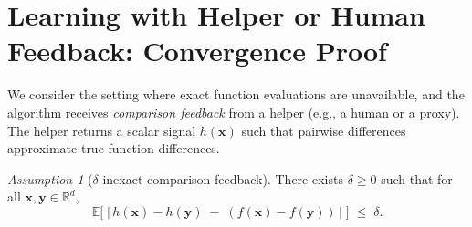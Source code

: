 \documentclass[twoside]{article}
\theoremstyle{plain}
\theoremstyle{definition}
\theoremstyle{remark}
\newtheorem{assumption}{Assumption}
\def\vx{{\bm{x}}}
\def\vy{{\bm{y}}}
\newcommand{\E}{\mathbb{E}}
\newcommand{\R}{\mathbb{R}}
\begin{document}
\section{Learning with Helper or Human Feedback: Convergence Proof}

We consider the setting where exact function evaluations are unavailable, and the
algorithm receives \emph{comparison feedback} from a helper (e.g., a human or a
proxy). The helper returns a scalar signal $h(\vx)$ such that pairwise
differences approximate true function differences.

\begin{assumption}[$\delta$-inexact comparison feedback]
\label{ass:delta-helper}
There exists $\delta\ge 0$ such that for all $\vx,\vy\in\R^d$,
\[
  \E\Big[\;\big|\,h(\vx)-h(\vy) \;-\; (f(\vx)-f(\vy))\,\big|\;\Big] \;\le\; \delta.
\]
\end{assumption}
\end{document}
